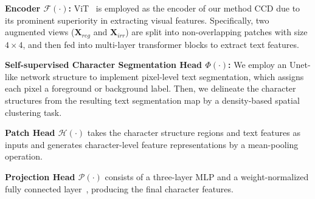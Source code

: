 \documentclass[10pt,twocolumn,letterpaper]{article}
\begin{document}
\noindent \textbf{Encoder $\mathcal{F(\cdot)}$:} ViT~\cite{ViT} is employed as the encoder of our method CCD due to its prominent superiority in extracting visual features. Specifically, two augmented views ($\mathbf{X}_{reg}$ and $\mathbf{X}_{irr}$) are split into non-overlapping patches with size $4\times4$, and then fed into multi-layer transformer blocks to extract text features. 

\noindent \textbf{Self-supervised Character Segmentation Head $\mathcal{\varPhi(\cdot)}$:} 
We employ an Unet-like network structure to implement pixel-level text segmentation, which assigns each pixel a foreground or background label.
Then, we delineate the character structures from the resulting text segmentation map by a density-based spatial clustering task.

\noindent \textbf{Patch Head $\mathcal{H(\cdot)}$} 
takes the character structure regions and text features as inputs and generates character-level feature representations by a mean-pooling operation.

\noindent \textbf{Projection Head $\mathcal{P(\cdot)}$} consists of a three-layer MLP and a weight-normalized fully connected layer~\cite{Dino}, producing the final character features.
\end{document}
